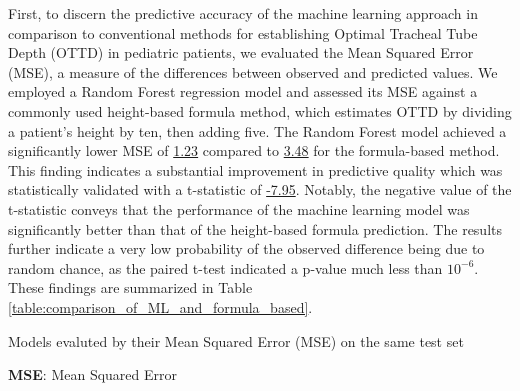 \documentclass[11pt]{article}
\begin{document}
First, to discern the predictive accuracy of the machine learning approach in comparison to conventional methods for establishing Optimal Tracheal Tube Depth (OTTD) in pediatric patients, we evaluated the Mean Squared Error (MSE), a measure of the differences between observed and predicted values. We employed a Random Forest regression model and assessed its MSE against a commonly used height-based formula method, which estimates OTTD by dividing a patient’s height by ten, then adding five. The Random Forest model achieved a significantly lower MSE of \hyperlink{A0a}{1.23} compared to \hyperlink{A1a}{3.48} for the formula-based method. This finding indicates a substantial improvement in predictive quality which was statistically validated with a t-statistic of \hyperlink{A0b}{-7.95}. Notably, the negative value of the t-statistic conveys that the performance of the machine learning model was significantly better than that of the height-based formula prediction. The results further indicate a very low probability of the observed difference being due to random chance, as the paired t-test indicated a p-value much less than \hyperlink{A0c}{$10^{-6}$}. These findings are summarized in Table \ref{table:comparison_of_ML_and_formula_based}.

\begin{table}[h]
\caption{\protect\hyperlink{file-table-1-pkl}{Comparison of performance between Machine Learning Model (Random Forest) and formula-based method}}
\label{table:comparison_of_ML_and_formula_based}
\begin{threeparttable}
\renewcommand{\TPTminimum}{\linewidth}
\begin{tablenotes}
\footnotesize
\item Models evaluted by their Mean Squared Error (MSE) on the same test set
\item \textbf{MSE}: Mean Squared Error
\end{tablenotes}
\end{threeparttable}
\end{table}
\end{document}
